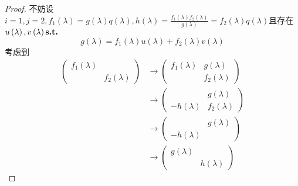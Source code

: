 {\begin{proof}
        不妨设$\displaystyle i=1,j=2,f_1\left(\lambda\right)=g\left(\lambda\right)q\left(\lambda\right),h\left(\lambda\right)=\frac{
                f_1\left(\lambda\right)f_2\left(\lambda\right)
            }{g\left(\lambda\right)}=f_2\left(\lambda\right)q\left(\lambda\right)$且存在$u\left(\lambda\right),v\left(\lambda\right)\textup{\bfseries{s.t.}}$\[
            g\left(\lambda\right)=f_1\left(\lambda\right)u\left(\lambda\right)+f_2\left(\lambda\right)v\left(\lambda\right)
        \]考虑到\begin{align*}
            \begin{pmatrix}
                f_1\left(\lambda\right) &                         \\
                                        & f_2\left(\lambda\right)
            \end{pmatrix} & \longrightarrow
            \begin{pmatrix}
                f_1\left(\lambda\right) & g\left(\lambda\right)   \\
                                        & f_2\left(\lambda\right)
            \end{pmatrix}                                                                    \\
                                                                 & \longrightarrow
            \begin{pmatrix}
                                       & g\left(\lambda\right)   \\
                -h\left(\lambda\right) & f_2\left(\lambda\right)
            \end{pmatrix}                                                                     \\
                                                                 & \longrightarrow\begin{pmatrix}
                                                                                                             & g\left(\lambda\right) \\
                                                                                      -h\left(\lambda\right) &
                                                                                  \end{pmatrix} \\
                                                                 & \longrightarrow\begin{pmatrix}
                                                                                      g\left(\lambda\right) &                       \\
                                                                                                            & h\left(\lambda\right)
                                                                                  \end{pmatrix}
        \end{align*}


\end{proof}}
